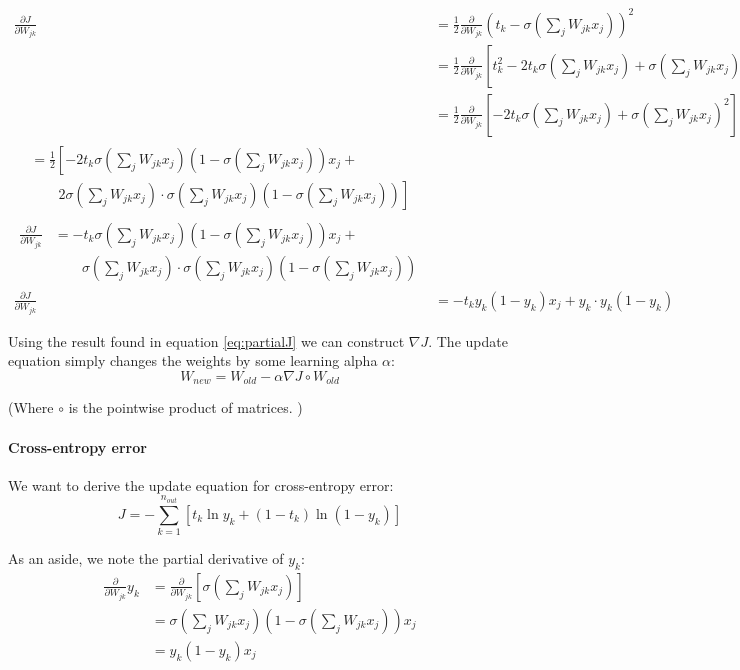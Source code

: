 \documentclass[11pt]{article}
\begin{document}
\newcommand{\sfn}{\sigma \left( \sum_j W_{jk} x_j\right)}
\begin{align}
\frac{\partial J}{\partial W_{jk}} &= \frac{1}{2}\frac{\partial}{\partial W_{jk}}\left(
t_k - \sfn
\right) ^2 \\
&= \frac{1}{2} \frac{\partial}{\partial W_{jk}} \left[ t_k^2 - 2t_k\sfn + \sfn^2 \right] \\
&= \frac{1}{2} \frac{\partial}{\partial W_{jk}} \left[- 2t_k\sfn + \sfn^2 \right] \\
\begin{split}
&= \frac{1}{2} \left[
-2t_k \sfn \left( 1 - \sfn \right) x_j \right.+ \\
& \qquad \left.2\sfn \cdot \sfn \left( 1 - \sfn \right)
\right]
\end{split} \\
\begin{split}
\frac{\partial J}{\partial W_{jk}} &= 
-t_k \sfn \left( 1 - \sfn \right) x_j + \\
& \qquad \sfn \cdot \sfn \left( 1 - \sfn \right)
\end{split} \\
 \label{eq:partialJ}
\frac{\partial J}{\partial W_{jk}} &= 
-t_k y_k \left( 1 - y_k \right) x_j + y_k \cdot y_k \left( 1 - y_k \right)
\end{align}

Using the result found in equation  \eqref{eq:partialJ} we can construct $\nabla J$. The update equation simply changes the weights by some learning alpha $\alpha$:
\[
	W_{new} = W_{old} - \alpha \nabla J \circ W_{old}
\]  

(Where $\circ$ is the pointwise product of matrices. )

\paragraph{Cross-entropy error} We want to derive the update equation for cross-entropy error:
\[
	J = - \sum_{k=1}^{n_{out}}\left[t_k \ln y_k + \left(1- t_k \right)\ln \left( 1- y_k \right) \right]
\]

As an aside, we note the partial derivative of $y_k$:
\begin{align}
\frac{\partial}{\partial W_{jk}} y_k &= \frac{\partial}{\partial W_{jk}} \left[ \sfn \right] \\ 
&= \sfn \left( 1 - \sfn \right) x_j \\
&= y_k \left( 1 - y_k \right) x_j
\end{align}
\end{document}
